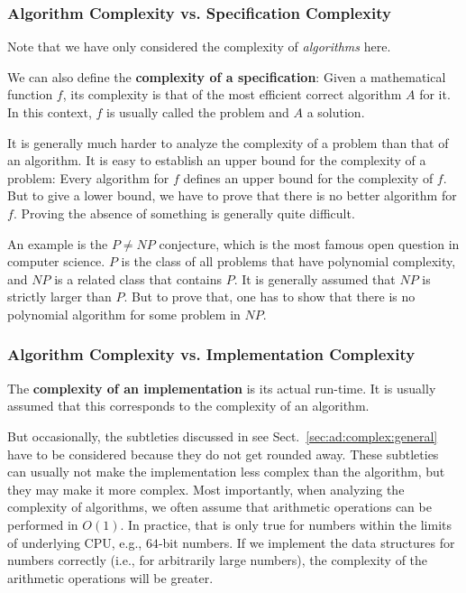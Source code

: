 \subsubsection{Algorithm Complexity vs. Specification Complexity}

Note that we have only considered the complexity of \emph{algorithms} here.

We can also define the \textbf{complexity of a specification}: Given a mathematical function $f$, its complexity is that of the most efficient correct algorithm $A$ for it.
In this context, $f$ is usually called the problem and $A$ a solution.

It is generally much harder to analyze the complexity of a problem than that of an algorithm.
It is easy to establish an upper bound for the complexity of a problem: Every algorithm for $f$ defines an upper bound for the complexity of $f$.
But to give a lower bound, we have to prove that there is no better algorithm for $f$.
Proving the absence of something is generally quite difficult.

An example is the $P\neq NP$ conjecture, which is the most famous open question in computer science.
$P$ is the class of all problems that have polynomial complexity, and $NP$ is a related class that contains $P$.
It is generally assumed that $NP$ is strictly larger than $P$.
But to prove that, one has to show that there is no polynomial algorithm for some problem in $NP$.

\subsubsection{Algorithm Complexity vs. Implementation Complexity}

The \textbf{complexity of an implementation} is its actual run-time.
It is usually assumed that this corresponds to the complexity of an algorithm.

But occasionally, the subtleties discussed in see Sect.~\ref{sec:ad:complex:general} have to be considered because they do not get rounded away.
These subtleties can usually not make the implementation less complex than the algorithm, but they may make it more complex.
Most importantly, when analyzing the complexity of algorithms, we often assume that arithmetic operations can be performed in $O(1)$.
In practice, that is only true for numbers within the limits of underlying CPU, e.g., $64$-bit numbers.
If we implement the data structures for numbers correctly (i.e., for arbitrarily large numbers), the complexity of the arithmetic operations will be greater.

